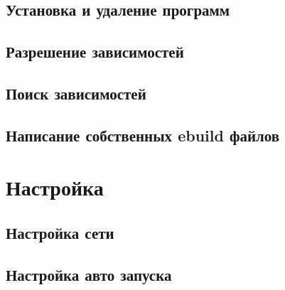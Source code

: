 \documentclass[12pt, a4paper]{article}
\begin{document}
\subsection{Установка и удаление программ}

\subsection{Разрешение зависимостей}

\subsection{Поиск зависимостей}

\subsection{Написание собственных ebuild файлов}

\newpage
\section{Настройка}

\subsection{Настройка сети}

\subsection{Настройка авто запуска}

\end{document}
